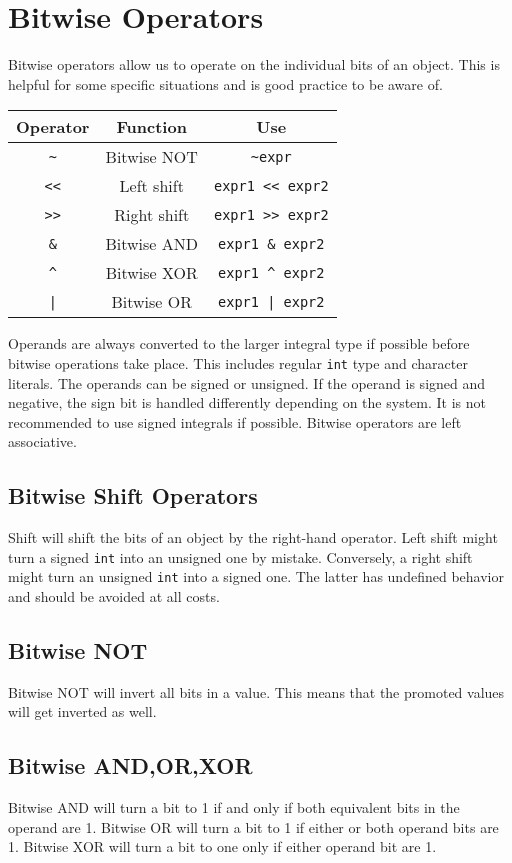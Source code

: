 \documentclass[12pt, a4paper]{report}
\begin{document}
\section{Bitwise Operators}
Bitwise operators allow us to operate on the individual bits of an object.
This is helpful for some specific situations and is good practice to be aware of.
\begin{center}
  \begin{tabular}{ |c|c|c| }
    \hline
    \textbf{Operator} & \textbf{Function} & \textbf{Use} \\
    \hline
    \verb|~| & Bitwise NOT & \verb|~expr| \\
    \hline
    \verb|<<| & Left shift & \verb|expr1 << expr2| \\
    \hline
    \verb|>>| & Right shift & \verb|expr1 >> expr2| \\
    \hline
    \verb|&| & Bitwise AND & \verb|expr1 & expr2| \\
    \hline
    \verb|^| & Bitwise XOR & \verb|expr1 ^ expr2| \\
    \hline
    \verb=|= & Bitwise OR & \verb=expr1 | expr2= \\
    \hline
  \end{tabular}
\end{center}
Operands are always converted to the larger integral type if possible before bitwise operations take place.
This includes regular \verb|int| type and character literals.
The operands can be signed or unsigned. 
If the operand is signed and negative, the sign bit is handled differently depending on the system.
It is not recommended to use signed integrals if possible.
Bitwise operators are left associative.

\subsection{Bitwise Shift Operators}
Shift will shift the bits of an object by the right-hand operator.
Left shift might turn a signed \verb|int| into an unsigned one by mistake.
Conversely, a right shift might turn an unsigned \verb|int| into a signed one.
The latter has undefined behavior and should be avoided at all costs.
\subsection{Bitwise NOT}
Bitwise NOT will invert all bits in a value.
This means that the promoted values will get inverted as well.
\subsection{Bitwise AND,OR,XOR}
Bitwise AND will turn a bit to 1 if and only if both equivalent bits in the operand are 1.
Bitwise OR will turn a bit to 1 if either or both operand bits are 1.
Bitwise XOR will turn a bit to one only if either operand bit are 1.
\end{document}
